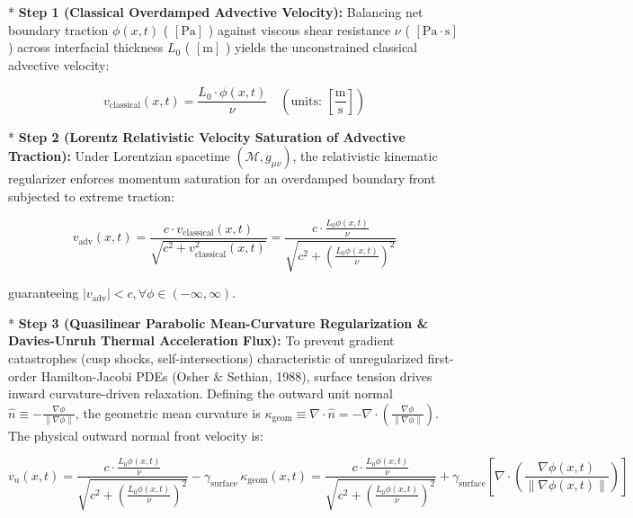 \documentclass[11pt,a4paper]{article}
\theoremstyle{definition}\newtheorem{definition}{Definition}
\theoremstyle{remark}\newtheorem{remark}{Remark}
\begin{document}
* \textbf{Step 1 (Classical Overdamped Advective Velocity):}
Balancing net boundary traction $\phi(x, t)$ ( $[\mathrm{Pa}]$ ) against viscous shear resistance $\nu$ ( $[\mathrm{Pa \cdot s}]$ ) across interfacial thickness $L_0$ ( $[\mathrm{m}]$ ) yields the unconstrained classical advective velocity:


\begin{equation}
v_{\text{classical}}(x, t) = \frac{L_0 \cdot \phi(x, t)}{\nu} \quad \left( \text{units: } [\frac{\mathrm{m}}{\mathrm{s}}] \right)
\end{equation}


* \textbf{Step 2 (Lorentz Relativistic Velocity Saturation of Advective Traction):}
Under Lorentzian spacetime $(\mathcal{M}, g_{\mu\nu})$, the relativistic kinematic regularizer enforces momentum saturation for an overdamped boundary front subjected to extreme traction:


\begin{equation}
v_{\text{adv}}(x, t) = \frac{c \cdot v_{\text{classical}}(x, t)}{\sqrt{c^2 + v_{\text{classical}}^2(x, t)}} = \frac{c \cdot \frac{L_0 \phi(x, t)}{\nu}}{\sqrt{c^2 + \left(\frac{L_0 \phi(x, t)}{\nu}\right)^2}}
\end{equation}


guaranteeing $|v_{\text{adv}}| < c, \forall \phi \in (-\infty, \infty)$.

* \textbf{Step 3 (Quasilinear Parabolic Mean-Curvature Regularization \& Davies-Unruh Thermal Acceleration Flux):}
To prevent gradient catastrophes (cusp shocks, self-intersections) characteristic of unregularized first-order Hamilton-Jacobi PDEs (Osher \& Sethian, 1988), surface tension drives inward curvature-driven relaxation. Defining the outward unit normal $\hat{n} \equiv -\frac{\nabla \phi}{\|\nabla \phi\|}$, the geometric mean curvature is $\kappa_{\text{geom}} \equiv \nabla \cdot \hat{n} = -\nabla \cdot \left(\frac{\nabla \phi}{\|\nabla \phi\|}\right)$. The physical outward normal front velocity is:


\begin{equation}
\boxed{v_n(x, t) = \frac{c \cdot \frac{L_0 \phi(x, t)}{\nu}}{\sqrt{c^2 + \left(\frac{L_0 \phi(x, t)}{\nu}\right)^2}} - \gamma_{\text{surface}} \, \kappa_{\text{geom}}(x, t) = \frac{c \cdot \frac{L_0 \phi(x, t)}{\nu}}{\sqrt{c^2 + \left(\frac{L_0 \phi(x, t)}{\nu}\right)^2}} + \gamma_{\text{surface}} [ \nabla \cdot \left( \frac{\nabla \phi(x, t)}{\|\nabla \phi(x, t)\|} \right) ]}
\end{equation}
\end{document}
